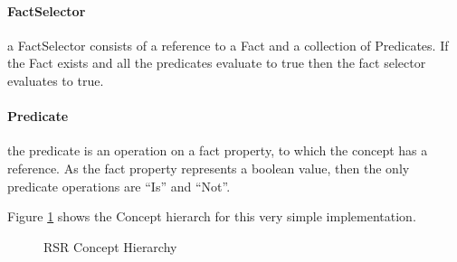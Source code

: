 \paragraph{FactSelector} a FactSelector consists of a reference to a Fact and a collection of Predicates.
If the Fact exists and all the predicates evaluate to true then the fact selector evaluates to true.

\paragraph{Predicate} the predicate is an operation on a fact property, to which the concept has a reference.
As the fact property represents a boolean value, then the only predicate operations are ``Is'' and ``Not''.

Figure \ref{fig:RSRDiagram} shows the Concept hierarch for this very simple implementation.

\begin{figure}[h]
    \centering
    \caption{RSR Concept Hierarchy}
    \label{fig:RSRDiagram}
\end{figure}


